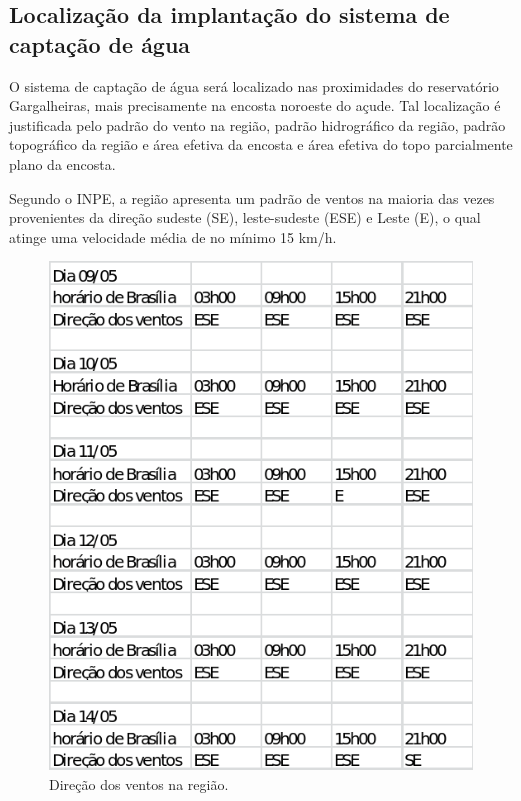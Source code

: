  \subsection{Localização da implantação do sistema de captação de água}
  
    O sistema de captação de água será localizado nas proximidades do reservatório Gargalheiras, mais precisamente na encosta
    noroeste do açude. Tal localização é justificada pelo padrão do vento na região, padrão hidrográfico da região, padrão
    topográfico da região e área efetiva da encosta e área efetiva do topo parcialmente plano da encosta.
    
    Segundo o INPE, a região apresenta um padrão de ventos na maioria das vezes provenientes da direção sudeste (SE), leste-sudeste
    (ESE) e Leste (E), o qual atinge uma velocidade média de no mínimo 15 km/h.
    
    \begin{figure}[h]
    \begin{center}
      \includegraphics[scale=0.6]{editaveis/figuras/estudo_ventos}
      \caption[Direção dos ventos na região]{Direção dos ventos na região. \footnotemark}
      \label{estudo_ventos}
    \end{center}
    \end{figure}
    \FloatBarrier
    

